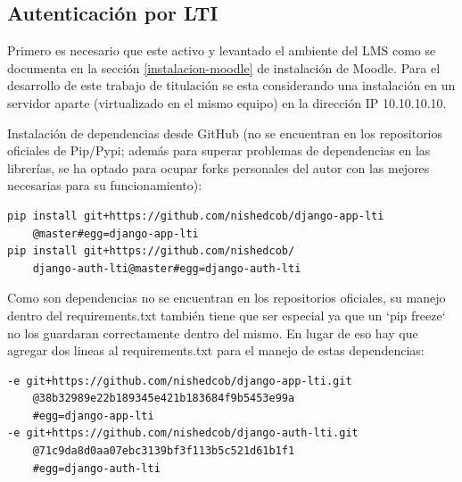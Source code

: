 \subsection{Autenticación por LTI}

Primero es necesario que este activo y levantado el ambiente del LMS  como se documenta en la sección \ref{instalacion-moodle} de instalación de Moodle. Para el desarrollo de este trabajo de titulación se esta considerando una instalación en un servidor aparte (virtualizado en el mismo equipo) en la dirección IP 10.10.10.10.


Instalación de dependencias desde GitHub (no se encuentran en los repositorios oficiales de Pip/Pypi; además para superar problemas de dependencias en las librerías, se ha optado para ocupar forks personales del autor con las mejores necesarias para su funcionamiento):
\begin{lstlisting}
pip install git+https://github.com/nishedcob/django-app-lti
    @master#egg=django-app-lti
pip install git+https://github.com/nishedcob/
    django-auth-lti@master#egg=django-auth-lti
\end{lstlisting}

Como son dependencias no se encuentran en los repositorios oficiales, su manejo dentro del requirements.txt también tiene que ser especial ya que un `pip freeze` no los guardaran correctamente dentro del mismo. En lugar de eso hay que agregar dos lineas al requirements.txt para el manejo de estas dependencias:
\begin{lstlisting}
-e git+https://github.com/nishedcob/django-app-lti.git
    @38b32989e22b189345e421b183684f9b5453e99a
    #egg=django-app-lti
-e git+https://github.com/nishedcob/django-auth-lti.git
    @71c9da8d0aa07ebc3139bf3f113b5c521d61b1f1
    #egg=django-auth-lti
\end{lstlisting}


\lstset{language=Python}

